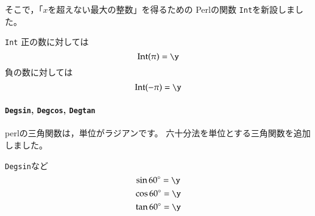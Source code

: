 そこで，「$x$を超えない最大の整数」を得るための \textsf{Perl}の関数
\texttt{Int}を新設しました。

\begin{showEx}{\texttt{Int}}
正の数に対しては
\y
\[ \mathrm{Int}(\pi)=\y \]
負の数に対しては
\y
\[ \mathrm{Int}(-\pi)=\y \]
\end{showEx}

\paragraph{\texttt{Degsin}, \texttt{Degcos}, \texttt{Degtan}}
\textsf{perl}の三角関数は，単位がラジアンです。
六十分法を単位とする三角関数を追加しました。

\begin{showEx}{\texttt{Degsin}など}
\y
\[ \sin60\Deg=\y \]
\y
\[ \cos60\Deg=\y \]
\y
\[ \tan60\Deg=\y \]
\end{showEx}

